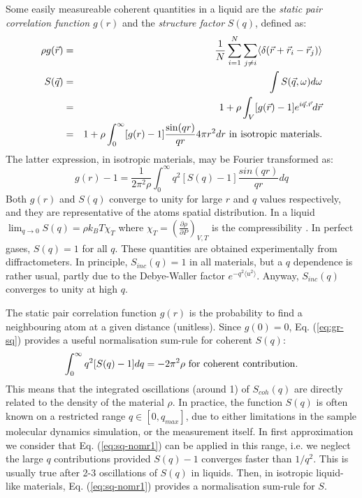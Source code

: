 Some easily measureable coherent quantities in a liquid are the \emph{static pair correlation function} $g(r)$ and the \emph{structure factor} $S(q)$, defined as:
\begin{eqnarray}
\rho g(\vec{r}) &=& \frac{1}{N} \sum_{i=1}^N \sum_{j \neq i} \langle \delta(\vec{r}+\vec{r}_i-\vec{r}_j) \rangle \\
S(\vec{q}) &=&\int S(\vec q,\omega) d\omega \label{eq:sq} \\
           &=&1 + \rho \int_V [g(\vec{r})-1] e^{i\vec{q}.\vec{r}} d\vec{r} \\
           &=&1 + \rho \int_{0}^{\infty} [g(r)-1] \frac{\sin(qr)}{qr} 4 \pi r^2 dr {\rm\ in\ isotropic\ materials.}
\end{eqnarray}
The latter expression, in isotropic materials, may be Fourier transformed as:
\begin{equation}
\label{eq:gr-sq}
g(r)-1 =\frac{1}{2\pi^2 \rho} \int_0^\infty q^2 [S(q) -1] \frac{sin(qr)}{qr} dq
\end{equation}
Both $g(r)$ and $S(q)$ converge to unity for large $r$ and $q$ values respectively, and they are representative of the atoms spatial distribution. In a liquid $\lim_{q \rightarrow 0} S(q) = \rho k_B T \chi_T$ where $\chi_T=(\frac{\partial \rho}{\partial P})_{V,T}$ is the compressibility \cite{Egelstaff67,fischer05}. In perfect gases, $S(q) = 1$ for all $q$. These quantities are obtained experimentally from diffractometers.
In principle, $S_{inc}(q) = 1$ in all materials, but a $q$ dependence is rather usual, partly due to the Debye-Waller factor $e^{-q^2 \langle u^2 \rangle}$. Anyway, $S_{inc}(q)$ converges to unity at high $q$.

The static pair correlation function $g(r)$ is the probability to find a neighbouring atom at a given distance (unitless). Since $g(0) = 0$, Eq. (\ref{eq:gr-sq}) provides a useful normalisation sum-rule for coherent $S(q)$:
\begin{equation}
\label{eq:sq-nomr1}
\int_0^\infty q^2 [S(q) - 1] dq = -2\pi^2\rho {\rm\ for\ coherent\ contribution.}
\end{equation}
This means that the integrated oscillations (around 1) of $S_{coh}(q)$ are directly related to the density of the material $\rho$.
In practice, the function $S(q)$ is often known on a restricted range $q \in [0, q_{max} ]$, due to either limitations in the sample molecular dynamics simulation, or the measurement itself.
In first approximation we consider that Eq. (\ref{eq:sq-nomr1}) can be applied in this range, i.e. we neglect the large $q$ contributions provided $S(q)-1$ converges faster than $1/q^2$. This is usually true after 2-3 oscillations of $S(q)$ in liquids.
Then, in isotropic liquid-like materials, Eq. (\ref{eq:sq-nomr1}) provides a normalisation sum-rule for $S$.

